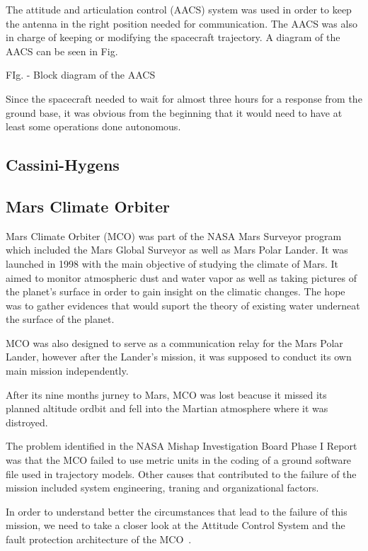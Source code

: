 The attitude and articulation control (AACS) system was used in order to keep
the antenna in the right position needed for communication. The AACS was also
in charge of keeping or modifying the spacecraft trajectory. A diagram of the
AACS can be seen in Fig.

FIg. - Block diagram of the AACS

Since the spacecraft needed to wait for almost three hours for a response from
the ground base, it was obvious from the beginning that it would need to have at
least some operations done autonomous.

\subsection{Cassini-Hygens}
\subsection{Mars Climate Orbiter}
Mars Climate Orbiter (MCO)\cite{mco-nasa} was part of the NASA Mars Surveyor
program which included the Mars Global Surveyor as well as Mars Polar Lander. It
was launched in 1998 with the main objective of studying the climate of Mars. It
aimed to monitor atmospheric dust and water vapor as well as taking pictures of
the planet's surface in order to gain insight on the climatic changes. The hope
was to gather evidences that would suport the theory of existing water underneat
the surface of the planet.

MCO was also designed to serve as a communication relay for the Mars Polar
Lander, however after the Lander's mission, it was supposed to conduct its own
main mission independently.

After its nine months jurney to Mars, MCO was lost beacuse it missed its planned
altitude ordbit and fell into the Martian atmosphere where it was distroyed.

The problem identified in the NASA Mishap Investigation Board Phase I
Report~\cite{mco-rep} was that the MCO failed to use metric units in the coding
of a ground software file used in trajectory models. Other causes that contributed to the failure of the
mission included system engineering, traning and organizational factors.

In order to understand better the circumstances that lead to the failure of this
mission, we need to take a closer look at the Attitude Control System and
the fault protection architecture of the MCO~\cite{surv-nasa-mars}.


